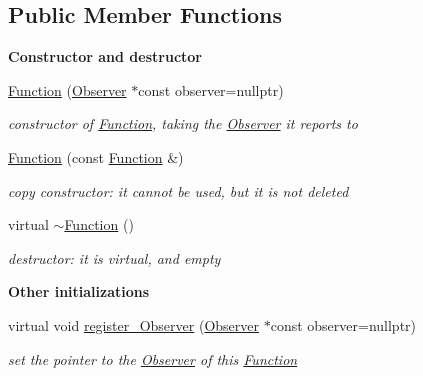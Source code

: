 \subsection*{Public Member Functions}
\begin{Indent}\textbf{ Constructor and destructor}\par
\begin{DoxyCompactItemize}
\item 
\mbox{\hyperlink{class_s_m_spp__di__unipi__it_1_1_function_ac37e74c32010429773a4e75a33a0928b}{Function}} (\mbox{\hyperlink{class_s_m_spp__di__unipi__it_1_1_observer}{Observer}} $\ast$const observer=nullptr)
\begin{DoxyCompactList}\small\item\em constructor of \mbox{\hyperlink{class_s_m_spp__di__unipi__it_1_1_function}{Function}}, taking the \mbox{\hyperlink{class_s_m_spp__di__unipi__it_1_1_observer}{Observer}} it reports to \end{DoxyCompactList}\item 
\mbox{\hyperlink{class_s_m_spp__di__unipi__it_1_1_function_ae0dc5d12ae80e0815315a10e7c3c25ab}{Function}} (const \mbox{\hyperlink{class_s_m_spp__di__unipi__it_1_1_function}{Function}} \&)
\begin{DoxyCompactList}\small\item\em copy constructor\+: it cannot be used, but it is not deleted \end{DoxyCompactList}\item 
\mbox{\label{class_s_m_spp__di__unipi__it_1_1_function_af90995647e802e28f0a10dec00761500}} 
virtual \mbox{\hyperlink{class_s_m_spp__di__unipi__it_1_1_function_af90995647e802e28f0a10dec00761500}{$\sim$\+Function}} ()
\begin{DoxyCompactList}\small\item\em destructor\+: it is virtual, and empty \end{DoxyCompactList}\end{DoxyCompactItemize}
\end{Indent}
\begin{Indent}\textbf{ Other initializations}\par
\begin{DoxyCompactItemize}
\item 
virtual void \mbox{\hyperlink{class_s_m_spp__di__unipi__it_1_1_function_a98c3b08492e868f06dfc9b5ada04cb8a}{register\+\_\+\+Observer}} (\mbox{\hyperlink{class_s_m_spp__di__unipi__it_1_1_observer}{Observer}} $\ast$const observer=nullptr)
\begin{DoxyCompactList}\small\item\em set the pointer to the \mbox{\hyperlink{class_s_m_spp__di__unipi__it_1_1_observer}{Observer}} of this \mbox{\hyperlink{class_s_m_spp__di__unipi__it_1_1_function}{Function}} \end{DoxyCompactList}\end{DoxyCompactItemize}
\end{Indent}
